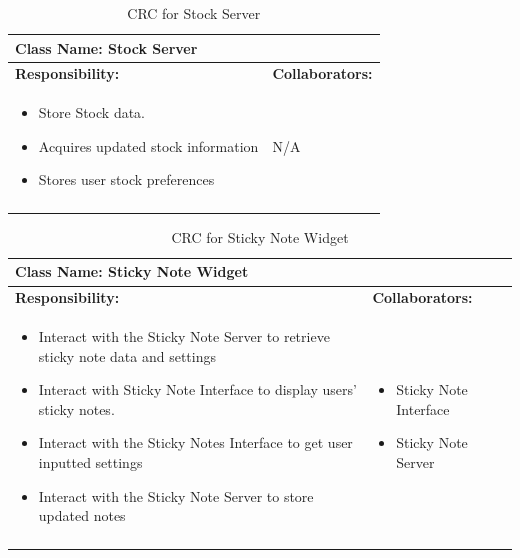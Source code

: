 \documentclass[]{article}
\begin{document}
\begin{longtable}{| p{} | p{} |}
	\hline
	\multicolumn{2}{|l|}{\textbf{Class Name: Stock Server}} \\
	\hline
	\textbf{Responsibility:} & \textbf{Collaborators:} \\
	\hline
	\begin{itemize}
		\item Store Stock data.
		\item Acquires updated stock information
		\item Stores user stock preferences
    \end{itemize} & \newline \newline  N/A \\
	\hline
	\caption{CRC for Stock Server}
\end{longtable}
\newpage
\begin{longtable}{| p{} | p{} |}
	\hline
	\multicolumn{2}{|l|}{\textbf{Class Name: Sticky Note Widget}} \\
	\hline
	\textbf{Responsibility:} & \textbf{Collaborators:} \\
	\hline
	\begin{itemize}
		\item Interact with the Sticky Note Server to retrieve sticky note data and settings
		\item Interact with Sticky Note Interface to display users' sticky notes.
		\item Interact with the Sticky Notes Interface to get user inputted settings
		\item Interact with the Sticky Note Server to store updated notes 
    \end{itemize} & 
	\begin{itemize}
		\item Sticky Note Interface
        \item Sticky Note Server
	\end{itemize} \\
	\hline
	\caption{CRC for Sticky Note Widget}
\end{longtable}
\end{document}
